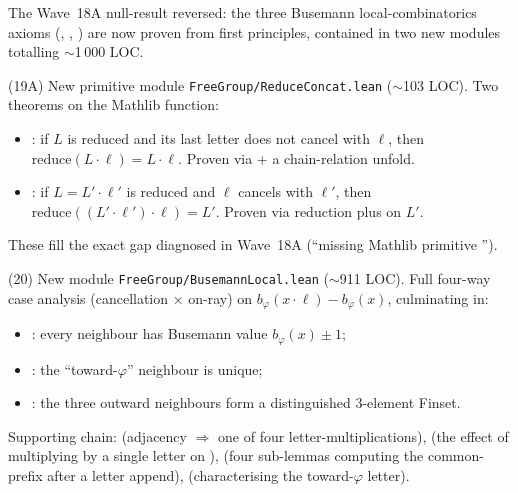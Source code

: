 \documentclass[11pt,a4paper]{article}
\newcommand{\lmod}[1]{\texttt{\small #1}}
\theoremstyle{plain}
\theoremstyle{definition}
\begin{document}
The Wave~18A null-result reversed: the three Busemann local-combinatorics
axioms (,
, )
are now proven from first principles, contained in two new modules
totalling $\sim$1\,000 LOC.

(19A) New primitive module \lmod{FreeGroup/ReduceConcat.lean}
($\sim$103 LOC). Two theorems on the Mathlib 
function:
\begin{itemize}[nosep]
  \item {}: if $L$ is reduced and
        its last letter does not cancel with $\ell$, then
        $\mathrm{reduce}(L \cdot \ell) = L \cdot \ell$. Proven via
         + a chain-relation unfold.
  \item {}: if $L = L' \cdot \ell'$ is
        reduced and $\ell$ cancels with $\ell'$, then
        $\mathrm{reduce}((L' \cdot \ell') \cdot \ell) = L'$. Proven via
         reduction plus 
        on $L'$.
\end{itemize}
These fill the exact gap diagnosed in Wave~18A
(``missing Mathlib primitive '').

(20) New module \lmod{FreeGroup/BusemannLocal.lean} ($\sim$911 LOC).
Full four-way case analysis (cancellation × on-ray) on
$b_\varphi(x \cdot \ell) - b_\varphi(x)$, culminating in:
\begin{itemize}[nosep]
  \item {}: every neighbour has
        Busemann value $b_\varphi(x) \pm 1$;
  \item {}: the ``toward-$\varphi$''
        neighbour is unique;
  \item {}: the three
        outward neighbours form a distinguished 3-element Finset.
\end{itemize}
Supporting chain: 
(adjacency $\Rightarrow$ one of four letter-multiplications),
 (the effect of
multiplying by a single letter on ),
(four sub-lemmas computing the common-prefix after a letter append),
 (characterising the
toward-$\varphi$ letter).
\end{document}
